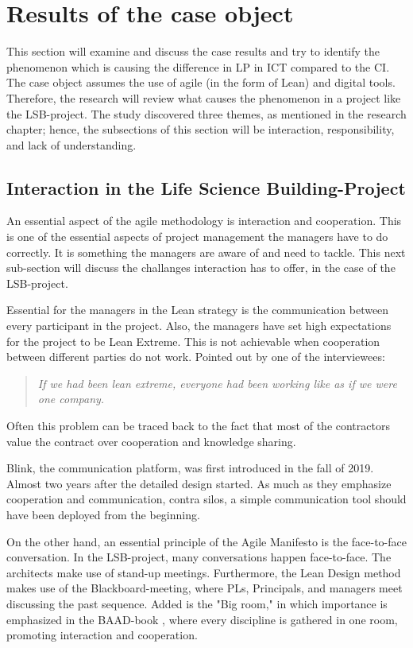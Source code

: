 \section{Results of the case object}
This section will examine and discuss the case results and try to identify the phenomenon which is causing the difference in LP in ICT compared to the CI. The case object assumes the use of agile (in the form of Lean) and digital tools. Therefore, the research will review what causes the phenomenon in a project like the LSB-project. The study discovered three themes, as mentioned in the research chapter; hence, the subsections of this section will be interaction, responsibility, and lack of understanding.

\subsection{Interaction in the Life Science Building-Project}
An essential aspect of the agile methodology is interaction and cooperation. This is one of the essential aspects of project management the managers have to do correctly. It is something the managers are aware of and need to tackle. This next sub-section will discuss the challanges interaction has to offer, in the case of the LSB-project.

Essential for the managers in the Lean strategy is the communication between every participant in the project. Also, the managers have set high expectations for the project to be Lean Extreme. This is not achievable when cooperation between different parties do not work. Pointed out by one of the interviewees:
\begin{quote}
    \textit{If we had been lean extreme, everyone had been working like as if we were one company.}
\end{quote}
Often this problem can be traced back to the fact that most of the contractors value the contract over cooperation and knowledge sharing. 

Blink, the communication platform, was first introduced in the fall of 2019. Almost two years after the detailed design started. As much as they emphasize cooperation and communication, contra silos, a simple communication tool should have been deployed from the beginning. 

On the other hand, an essential principle of the Agile Manifesto is the face-to-face conversation. In the LSB-project, many conversations happen face-to-face. The architects make use of stand-up meetings. Furthermore, the Lean Design method makes use of the Blackboard-meeting, where PLs, Principals, and managers meet discussing the past sequence. Added is the "Big room," in which importance is emphasized in the BAAD-book \cite{lean_i_praksis}, where every discipline is gathered in one room, promoting interaction and cooperation. 

